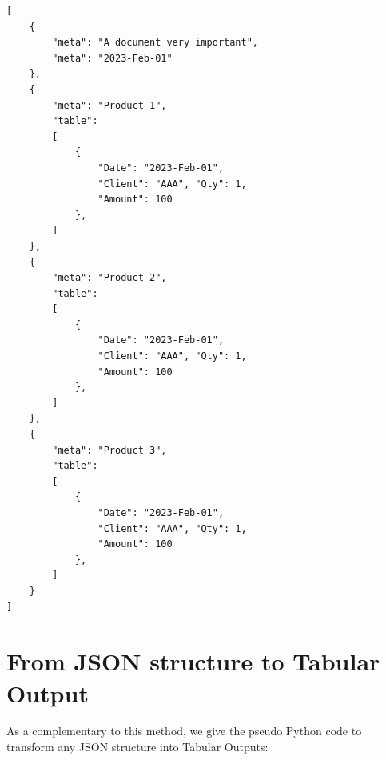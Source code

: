 \documentclass{article}
\begin{document}
\begin{lstlisting}[caption=JSON Structure]
[
    {
		"meta": "A document very important",
		"meta": "2023-Feb-01"
    },
    {
		"meta": "Product 1",
		"table": 
		[
            {
                "Date": "2023-Feb-01", 
                "Client": "AAA", "Qty": 1,
                "Amount": 100
            },
        ]
    },
    {
		"meta": "Product 2",
		"table": 
		[
			{
                "Date": "2023-Feb-01",
                "Client": "AAA", "Qty": 1,
                "Amount": 100
            },
        ]
    },
    {
		"meta": "Product 3",
		"table": 
		[
			{
                "Date": "2023-Feb-01",
                "Client": "AAA", "Qty": 1,
                "Amount": 100
            },
        ]
    }
]
\end{lstlisting}

\section{From JSON structure to Tabular Output}
As a complementary to this method, we give the pseudo Python code to transform any JSON structure into Tabular Outputs:
\end{document}
